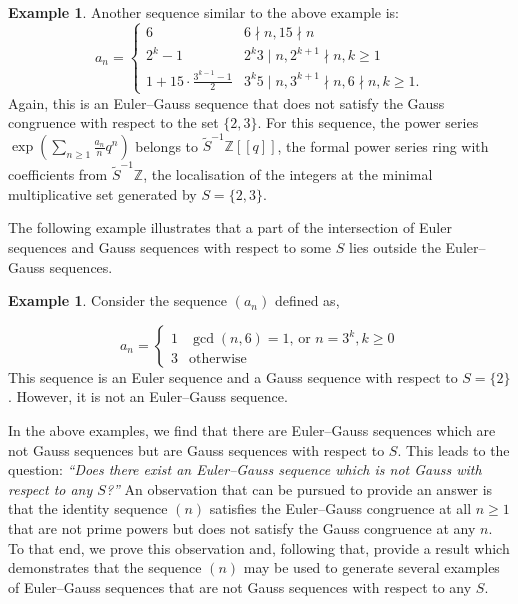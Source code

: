 \documentclass{article}
\numberwithin{equation}{section}
\theoremstyle{definition}
\newtheorem{example}[definition]{\bf {Example}}
\begin{document}
\begin{example}
Another sequence similar to the above example is: 
\[
    a_n=
    \begin{cases}
        6 & 6\nmid n, 15\nmid n\\
        2^k-1 & 2^k3\mid n, 2^{k+1}\nmid n, k\geq 1\\
        1+15\cdot\frac{3^{k-1}-1}{2} & 3^k5\mid n, 3^{k+1}\nmid n, 6\nmid n, k\geq1.
    \end{cases}
\]
Again, this is an Euler--Gauss sequence that does not satisfy the Gauss congruence with respect to the set $\{2,3\}$. For this sequence, the power series $\exp(\sum_{n\geq1}\frac{a_n}{n}q^n)$ belongs to $\tilde{S}^{-1}\mathbb{Z}[[q]]$, the formal power series ring with coefficients from $\tilde{S}^{-1}\mathbb{Z}$, the localisation of the integers at the minimal multiplicative set generated by $S=\{2,3\}$.     
\end{example}
The following example illustrates that a part of the intersection of Euler sequences and Gauss sequences with respect to some $S$ lies outside the Euler--Gauss sequences.
\begin{example}\label{ex:4}
    Consider the sequence $(a_n)$ defined as,  

\[a_n=\begin{cases}
    1&\gcd(n,6)=1\text{, or }n=3^k, k\geq0\\
    3&\text{otherwise}
\end{cases}\]
This sequence is an Euler sequence and a Gauss sequence with respect to $S=\{2\}$. However, it is not an Euler--Gauss sequence.
\end{example}

In the above examples, we find that there are Euler--Gauss sequences which are not Gauss sequences but are Gauss sequences with respect to $S$. This leads to the question: \emph{``Does there exist an Euler--Gauss sequence which is not Gauss with respect to any $S$?''} An observation that can be pursued to provide an answer is that the identity sequence $(n)$ satisfies the Euler--Gauss congruence at all $n\geq1$ that are not prime powers but does not satisfy the Gauss congruence at any $n$. To that end, we prove this observation and, following that, provide a result which demonstrates that the sequence $(n)$ may be used to generate several examples of Euler--Gauss sequences that are not Gauss sequences with respect to any $S$. 
\end{document}
